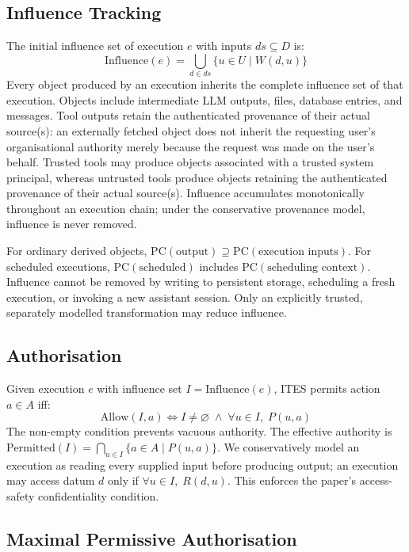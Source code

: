 \documentclass{article}
\begin{document}
\subsection{Influence Tracking}

The initial influence set of execution $e$ with inputs $ds \subseteq D$ is:
\[
\mathrm{Influence}(e) = \bigcup_{d \in ds} \{u \in U \mid W(d,u)\}
\]
Every object produced by an execution inherits the complete influence set of
that execution. Objects include intermediate LLM outputs, files, database
entries, and messages. Tool outputs retain the authenticated provenance of
their actual source(s): an externally fetched object does not inherit the
requesting user's organisational authority merely because the request was
made on the user's behalf. Trusted tools may produce objects associated with a
trusted system principal, whereas untrusted tools produce objects retaining
the authenticated provenance of their actual source(s). Influence accumulates
monotonically throughout an execution chain; under the conservative provenance
model, influence is never removed.

For ordinary derived objects, $\mathrm{PC}(\text{output}) \supseteq
\mathrm{PC}(\text{execution inputs})$. For scheduled executions,
$\mathrm{PC}(\text{scheduled})$ includes $\mathrm{PC}(\text{scheduling
context})$. Influence cannot be removed by writing to persistent storage,
scheduling a fresh execution, or invoking a new assistant session. Only an
explicitly trusted, separately modelled transformation may reduce influence.

\subsection{Authorisation}

Given execution $e$ with influence set $I = \mathrm{Influence}(e)$, ITES
permits action $a \in A$ iff:
\[
\mathrm{Allow}(I, a) \iff I \neq \varnothing \;\land\; \forall u \in I,\; P(u,a)
\]
The non-empty condition prevents vacuous authority. The effective authority is
$\mathrm{Permitted}(I) = \bigcap_{u \in I} \{a \in A \mid P(u,a)\}$. We
conservatively model an execution as reading every supplied input before
producing output; an execution may access datum $d$ only if $\forall u \in I,\;
R(d,u)$. This enforces the paper's access-safety confidentiality condition.

\subsection{Maximal Permissive Authorisation}
\end{document}
